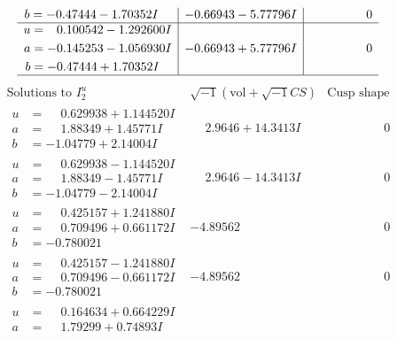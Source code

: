 \documentclass[1p]{elsarticle_modified}
\theoremstyle{definition}
\newcommand{\I}{\sqrt{-1}}
\begin{document}
$$\begin{array}{c|c|c}
\begin{aligned}
b &= -0.47444 - 1.70352 I\end{aligned}
 & -0.66943 - 5.77796 I & \phantom{-0.000000 } 0 \\ \hline\begin{aligned}
u &= \phantom{-}0.100542 - 1.292600 I \\
a &= -0.145253 - 1.056930 I \\
b &= -0.47444 + 1.70352 I\end{aligned}
 & -0.66943 + 5.77796 I & \phantom{-0.000000 } 0\\
 \hline 
 \end{array}$$\newpage$$\begin{array}{c|c|c}  
\text{Solutions to }I^u_{2}& \I (\text{vol} + \sqrt{-1}CS) & \text{Cusp shape}\\
 \hline 
\begin{aligned}
u &= \phantom{-}0.629938 + 1.144520 I \\
a &= \phantom{-}1.88349 + 1.45771 I \\
b &= -1.04779 + 2.14004 I\end{aligned}
 & \phantom{-}2.9646 + 14.3413 I & \phantom{-0.000000 } 0 \\ \hline\begin{aligned}
u &= \phantom{-}0.629938 - 1.144520 I \\
a &= \phantom{-}1.88349 - 1.45771 I \\
b &= -1.04779 - 2.14004 I\end{aligned}
 & \phantom{-}2.9646 - 14.3413 I & \phantom{-0.000000 } 0 \\ \hline\begin{aligned}
u &= \phantom{-}0.425157 + 1.241880 I \\
a &= \phantom{-}0.709496 + 0.661172 I \\
b &= -0.780021\phantom{ +0.000000I}\end{aligned}
 & -4.89562\phantom{ +0.000000I} & \phantom{-0.000000 } 0 \\ \hline\begin{aligned}
u &= \phantom{-}0.425157 - 1.241880 I \\
a &= \phantom{-}0.709496 - 0.661172 I \\
b &= -0.780021\phantom{ +0.000000I}\end{aligned}
 & -4.89562\phantom{ +0.000000I} & \phantom{-0.000000 } 0 \\ \hline\begin{aligned}
u &= \phantom{-}0.164634 + 0.664229 I \\
a &= \phantom{-}1.79299 + 0.74893 I \\

\end{aligned}
\end{array}$$
\end{document}
